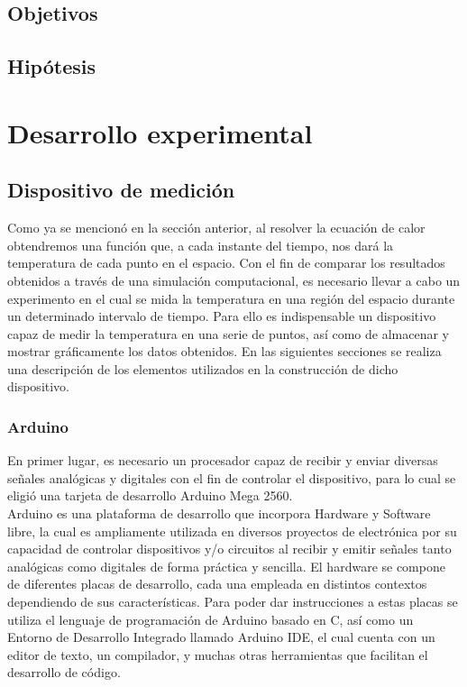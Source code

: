 \documentclass[12pt]{article}
\begin{document}
\subsection{Objetivos}
\subsection{Hipótesis}

\section{Desarrollo experimental}

\newpage

\subsection{Dispositivo de medición}

Como ya se mencionó en la sección anterior, al resolver la ecuación de calor obtendremos una función que, a cada instante del tiempo, nos dará la temperatura de cada punto en el espacio. Con el fin de comparar los resultados obtenidos a través de una simulación computacional, es necesario llevar a cabo un experimento en el cual se mida la temperatura en una región del espacio durante un determinado intervalo de tiempo. Para ello es indispensable un dispositivo capaz de medir la temperatura en una serie de puntos, así como de almacenar y mostrar gráficamente los datos obtenidos. En las siguientes secciones se realiza una descripción de los elementos utilizados en la construcción de dicho dispositivo.


\subsubsection{Arduino}

En primer lugar, es necesario un procesador capaz de recibir y enviar diversas señales analógicas y digitales con el fin de controlar el dispositivo, para lo cual se eligió una tarjeta de desarrollo Arduino Mega 2560. \\

Arduino es una plataforma de desarrollo que incorpora Hardware y Software libre, la cual es ampliamente utilizada en diversos proyectos de electrónica por su capacidad de controlar dispositivos y/o circuitos al recibir y emitir señales tanto analógicas como digitales de forma práctica y sencilla. El hardware se compone de diferentes placas de desarrollo, cada una empleada en distintos contextos dependiendo de sus características. Para poder dar instrucciones a estas placas se utiliza el lenguaje de programación de Arduino basado en C, así como un Entorno de Desarrollo Integrado llamado Arduino IDE, el cual cuenta con un editor de texto, un compilador, y muchas otras herramientas que facilitan el desarrollo de código. \\
\end{document}
